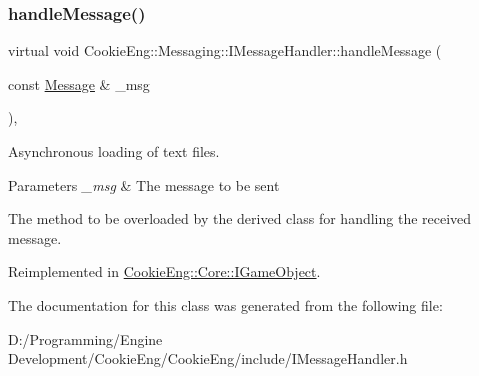 \subsubsection{\texorpdfstring{handle\+Message()}{handleMessage()}}
{\footnotesize\ttfamily virtual void Cookie\+Eng\+::\+Messaging\+::\+I\+Message\+Handler\+::handle\+Message (\begin{DoxyParamCaption}\item[{const \hyperlink{class_cookie_eng_1_1_messaging_1_1_message}{Message} \&}]{\+\_\+msg }\end{DoxyParamCaption})\hspace{0.3cm}{\ttfamily [inline]}, {\ttfamily [virtual]}}



Asynchronous loading of text files. 


\begin{DoxyParams}{Parameters}
{\em \+\_\+msg} & The message to be sent\\
\hline
\end{DoxyParams}
The method to be overloaded by the derived class for handling the received message. 

Reimplemented in \hyperlink{class_cookie_eng_1_1_core_1_1_i_game_object_a84648d30ac6fc65183a6f6f49f939eb2}{Cookie\+Eng\+::\+Core\+::\+I\+Game\+Object}.



The documentation for this class was generated from the following file\+:\begin{DoxyCompactItemize}
\item 
D\+:/\+Programming/\+Engine Development/\+Cookie\+Eng/\+Cookie\+Eng/include/I\+Message\+Handler.\+h\end{DoxyCompactItemize}
